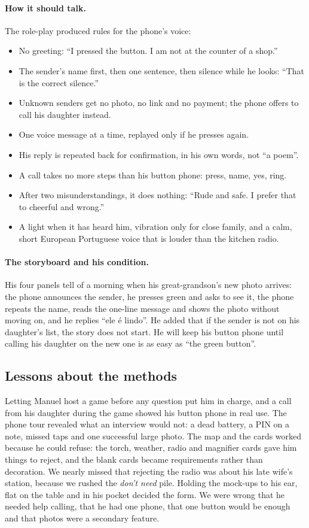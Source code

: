 \documentclass[acmtog,nonacm]{acmart}
\begin{document}
\paragraph{How it should talk.} The role-play produced rules for the phone's voice:
\begin{itemize}
  \item No greeting: ``I pressed the button. I am not at the counter of a shop.''
  \item The sender's name first, then one sentence, then silence while he looks: ``That is the correct silence.''
  \item Unknown senders get no photo, no link and no payment; the phone offers to call his daughter instead.
  \item One voice message at a time, replayed only if he presses again.
  \item His reply is repeated back for confirmation, in his own words, not ``a poem''.
  \item A call takes no more steps than his button phone: press, name, yes, ring.
  \item After two misunderstandings, it does nothing: ``Rude and safe. I prefer that to cheerful and wrong.''
  \item A light when it has heard him, vibration only for close family, and a calm, short European Portuguese voice that is louder than the kitchen radio.
\end{itemize}

\paragraph{The storyboard and his condition.} His four panels tell of a morning when his great-grandson's new photo arrives: the phone announces the sender, he presses green and asks to see it, the phone repeats the name, reads the one-line message and shows the photo without moving on, and he replies ``ele \'e lindo''. He added that if the sender is not on his daughter's list, the story does not start. He will keep his button phone until calling his daughter on the new one is as easy as ``the green button''.

\subsection{Lessons about the methods}
Letting Manuel host a game before any question put him in charge, and a call from his daughter during the game showed his button phone in real use. The phone tour revealed what an interview would not: a dead battery, a PIN on a note, missed taps and one successful large photo. The map and the cards worked because he could refuse: the torch, weather, radio and magnifier cards gave him things to reject, and the blank cards became requirements rather than decoration. We nearly missed that rejecting the radio was about his late wife's station, because we rushed the \emph{don't need} pile. Holding the mock-ups to his ear, flat on the table and in his pocket decided the form. We were wrong that he needed help calling, that he had one phone, that one button would be enough and that photos were a secondary feature.
\end{document}

